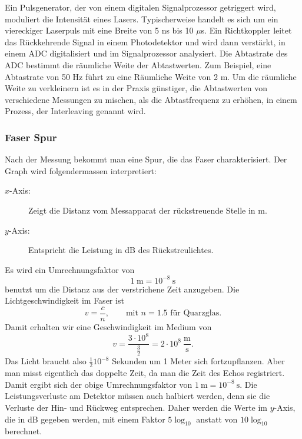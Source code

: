 \documentclass[a4paper]{article}
\begin{document}
Ein Pulsgenerator, der von einem digitalen Signalprozessor getriggert wird,
moduliert die Intensität eines Lasers. Typischerweise handelt es sich um ein
viereckiger Laserpuls mit eine Breite von 5 ns bis 10 $\mu$s. Ein
Richtkoppler leitet das Rückkehrende Signal in einem Photodetektor und wird
dann verstärkt, in einem ADC digitalisiert und im Signalprozessor analysiert.
Die Abtastrate des ADC bestimmt die räumliche Weite der Abtastwerten. Zum
Beispiel, eine Abtastrate von 50 Hz führt zu eine Räumliche Weite von 2 m. Um
die räumliche Weite zu verkleinern ist es in der Praxis günstiger, die
Abtastwerten von verschiedene Messungen zu mischen, als die Abtastfrequenz zu
erhöhen, in einem Prozess, der Interleaving genannt wird.

\subsubsection{Faser Spur}
Nach der Messung bekommt man eine Spur, die das Faser charakterisiert. Der
Graph wird folgendermassen interpretiert:
\begin{description}
  \item[$x$-Axis:] Zeigt die Distanz vom Messapparat der rückstreuende Stelle
    in m.
  \item[$y$-Axis:] Entspricht die Leistung in dB des Rückstreulichtes.
\end{description}
Es wird ein Umrechnungsfaktor von 
\begin{equation*}
1 \ \mathrm m = 10^{-8} \ \mathrm s 
\end{equation*}
benutzt um die Distanz aus der verstrichene Zeit anzugeben. Die
Lichtgeschwindigkeit im Faser ist
\begin{equation*}
  v = \frac{c}{n}, \quad\quad \text{mit } n = 1.5 \text{ für Quarzglas.}
\end{equation*}
Damit erhalten wir eine Geschwindigkeit im Medium von 
\begin{equation*}
  v = \frac{3 \cdot 10^{8}}{\frac{3}{2}} = 2 \cdot 10^{8}
  \ \frac{\mathrm m}{\mathrm s}.
\end{equation*} Das Licht braucht also $\frac{1}{2} 10^{-8}$ Sekunden um 1
Meter sich fortzupflanzen. Aber man misst eigentlich das doppelte Zeit, da man
die Zeit des Echos registriert. Damit ergibt sich der obige Umrechnungsfaktor
von $1\ \mathrm m = 10^{-8} \ \mathrm s$. Die Leistungsverluste am Detektor
müssen auch halbiert werden, denn sie die Verluste der Hin- und Rückweg
entsprechen. Daher werden die Werte im $y$-Axis, die in dB gegeben werden, mit
einem Faktor $5\log_{10}$ anstatt von $10\log_{10}$ berechnet.
\end{document}
